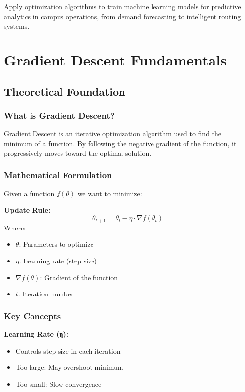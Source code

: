 \documentclass[
  letterpaper,
  DIV=11,
  numbers=noendperiod]{scrreprt}
\providecommand{\tightlist}{%
  \setlength{\itemsep}{0pt}\setlength{\parskip}{0pt}}
\begin{document}
Apply optimization algorithms to train machine learning models for
predictive analytics in campus operations, from demand forecasting to
intelligent routing systems.

\section{Gradient Descent
Fundamentals}\label{gradient-descent-fundamentals}

\subsection{Theoretical Foundation}\label{theoretical-foundation-10}

\subsubsection{What is Gradient
Descent?}\label{what-is-gradient-descent}

Gradient Descent is an iterative optimization algorithm used to find the
minimum of a function. By following the negative gradient of the
function, it progressively moves toward the optimal solution.

\subsubsection{Mathematical
Formulation}\label{mathematical-formulation-3}

Given a function \(f(\theta)\) we want to minimize:

\textbf{Update Rule:} \[
\theta_{t+1} = \theta_t - \eta \cdot \nabla f(\theta_t)
\] Where:

\begin{itemize}
\tightlist
\item
  \(\theta\): Parameters to optimize
\item
  \(\eta\): Learning rate (step size)
\item
  \(\nabla f(\theta)\): Gradient of the function
\item
  \(t\): Iteration number
\end{itemize}

\subsubsection{Key Concepts}\label{key-concepts}

\textbf{Learning Rate (η):}

\begin{itemize}
\tightlist
\item
  Controls step size in each iteration
\item
  Too large: May overshoot minimum
\item
  Too small: Slow convergence
\end{itemize}
\end{document}
